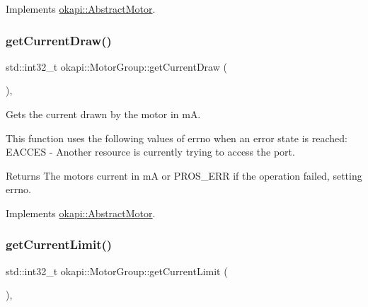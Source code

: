 Implements \mbox{\hyperlink{classokapi_1_1AbstractMotor_a157407c39c952a7c2eb497bddb868c93}{okapi\+::\+Abstract\+Motor}}.

\mbox{\label{classokapi_1_1MotorGroup_a5cdc06b92c943b2348130b162f6c5f16}} 
\subsubsection{\texorpdfstring{getCurrentDraw()}{getCurrentDraw()}}
{\footnotesize\ttfamily std\+::int32\+\_\+t okapi\+::\+Motor\+Group\+::get\+Current\+Draw (\begin{DoxyParamCaption}{ }\end{DoxyParamCaption})\hspace{0.3cm}{\ttfamily [override]}, {\ttfamily [virtual]}}

Gets the current drawn by the motor in mA.

This function uses the following values of errno when an error state is reached\+: E\+A\+C\+C\+ES -\/ Another resource is currently trying to access the port.

\begin{DoxyReturn}{Returns}
The motor\textquotesingle{}s current in mA or P\+R\+O\+S\+\_\+\+E\+RR if the operation failed, setting errno. 
\end{DoxyReturn}


Implements \mbox{\hyperlink{classokapi_1_1AbstractMotor_a755ad2c78a4b36cc56eef1029a3aa217}{okapi\+::\+Abstract\+Motor}}.

\mbox{\label{classokapi_1_1MotorGroup_afe3f1ed73d64cc7204074d5cdb2a874e}} 
\subsubsection{\texorpdfstring{getCurrentLimit()}{getCurrentLimit()}}
{\footnotesize\ttfamily std\+::int32\+\_\+t okapi\+::\+Motor\+Group\+::get\+Current\+Limit (\begin{DoxyParamCaption}{ }\end{DoxyParamCaption})\hspace{0.3cm}{\ttfamily [override]}, {\ttfamily [virtual]}}

